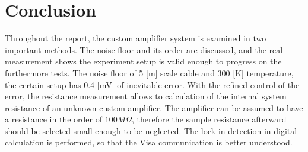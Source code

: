 \documentclass{article}
\begin{document}
\section{Conclusion}
Throughout the report, the custom amplifier system is examined in two important methods.
The noise floor and its order are discussed, and the real measurement shows the experiment setup is valid enough to progress on the furthermore tests.
The noise floor of 5 [m] scale cable and 300 [K] temperature, the certain setup has 0.4 [mV] of inevitable error.
With the refined control of the error, the resistance measurement allows to calculation of the internal system resistance of an unknown custom amplifier.
The amplifier can be assumed to have a resistance in the order of $100M \Omega$, therefore the sample resistance afterward should be selected small enough to be neglected.
The lock-in detection in digital calculation is performed, so that the Visa communication is better understood.



\end{document}
